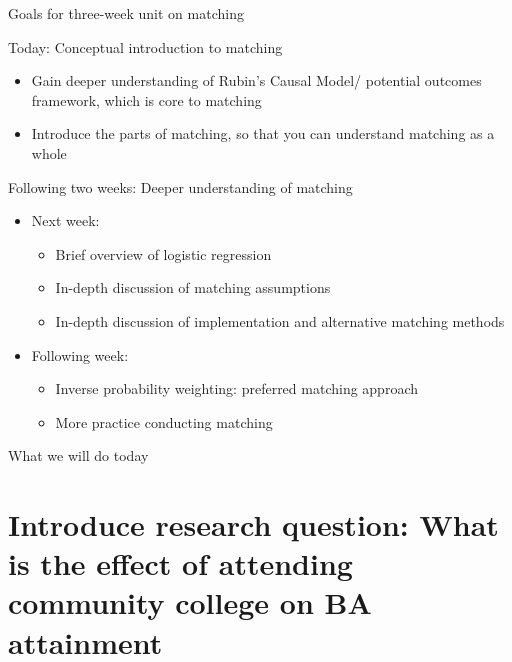 \begin{frame}{Goals for three-week unit on matching}


	Today: Conceptual introduction to matching
		\begin{itemize}
			\item Gain deeper understanding of Rubin's Causal Model/ potential outcomes framework, which is core to matching		
			\item Introduce the parts of matching, so that you can understand matching as a whole
			
		\end{itemize}
	\vspace{3mm}		
	Following two weeks: Deeper understanding of matching
		\begin{itemize}
			\item Next week:
			\begin{itemize}
				\item Brief overview of logistic regression
				\item In-depth discussion of matching assumptions
				\item In-depth discussion of implementation and alternative matching methods
			\end{itemize}
			\item Following week:
			\begin{itemize}
				\item Inverse probability weighting: preferred matching approach
				\item More practice conducting matching
			\end{itemize}
		\end{itemize}

\end{frame}

\begin{frame}{What we will do today}
	\tableofcontents
\end{frame}

\section[Introduce RQ]{Introduce research question: What is the effect of attending community college on BA attainment}

